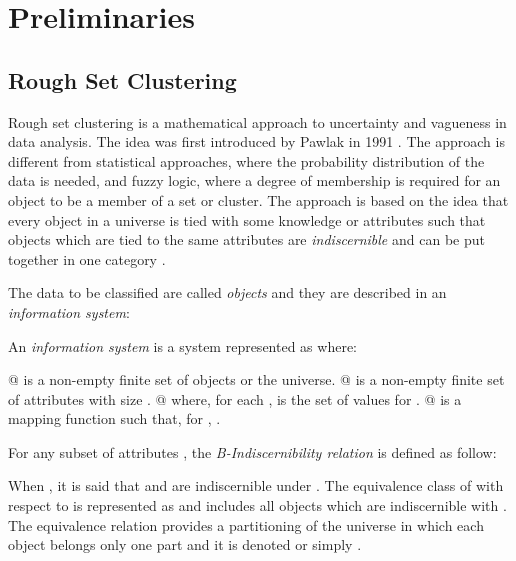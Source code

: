 \documentclass[twocolumn]{svjour3}          \smartqed
\begin{document}
\section{Preliminaries}\label{sec:preliminaries}

\subsection{Rough Set Clustering}\label{sec:rough_sets}

Rough set clustering is a mathematical approach to uncertainty and vagueness in data analysis. The idea was first introduced by Pawlak in 1991 \cite{pawlak1991}. The approach is different from statistical approaches, where the probability distribution of the data is needed, and fuzzy logic, where a degree of membership is required for an object to be a member of a set or cluster. The approach is based on the idea that every object in a universe is tied with some knowledge or attributes such that objects which are tied to the same attributes are \textit{indiscernible} and can be put together in one category \cite{pawlak2005rough}. 


The data to be classified are called \textit{objects} and they are described in an \textit{information system}:

\begin{definition} \label{def:infosys}
An \textit{information system} is a system represented as  where:
	\begin{easylist}[itemize]
	@ \emph{} is a non-empty finite set of objects or the universe.
	@ \emph{} is a non-empty finite set of attributes with size .
	@ \emph{} where, for each ,  is the set of values for .
	@ \emph{} is a mapping function such that, for , .  
	\end{easylist}
\end{definition}



For any subset of attributes , the \textit{B-Indiscernibility relation} is defined as follow:



When , it is said that  and  are indiscernible under . The equivalence class of  with respect to  is represented as  and includes all objects which are indiscernible with . The equivalence relation provides a partitioning of the universe  in which each object belongs only one part and it is denoted  or simply .
\end{document}

